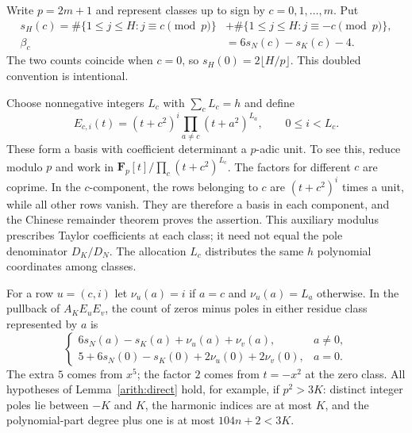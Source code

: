 Write $p=2m+1$ and represent classes up to sign by
$c=0,1,\ldots,m$. Put
\begin{align*}
 s_H(c)=\#\{1\le j\le H:j\equiv c\pmod p\}
       &+\#\{1\le j\le H:j\equiv-c\pmod p\},\\
 \beta_c&=6s_N(c)-s_K(c)-4.
\end{align*}
The two counts coincide when $c=0$, so $s_H(0)=2\lfloor H/p\rfloor$.
This doubled convention is intentional.

Choose nonnegative integers $L_c$ with $\sum_cL_c=h$ and define
\[
 E_{c,i}(t)=(t+c^2)^i\prod_{a\ne c}(t+a^2)^{L_a},
 \qquad 0\le i<L_c.
\]
These form a basis with coefficient determinant a $p$-adic unit.
To see this, reduce modulo $p$ and work in
$\mathbf F_p[t]/\prod_c(t+c^2)^{L_c}$.
The factors for different $c$ are coprime. In the $c$-component,
the rows belonging to $c$ are $(t+c^2)^i$ times a unit, while
all other rows vanish. They are therefore a basis in each component,
and the Chinese remainder theorem proves the assertion.
This auxiliary modulus prescribes Taylor coefficients at each class;
it need not equal the pole denominator \(D_K/D_N\). The allocation
\(L_c\) distributes the same \(h\) polynomial coordinates among classes.

For a row $u=(c,i)$ let
$\nu_u(a)=i$ if $a=c$ and $\nu_u(a)=L_a$ otherwise.
In the pullback of $A_KE_uE_v$, the count of zeros minus poles in
either residue class represented by $a$ is
\[
 \begin{cases}
 6s_N(a)-s_K(a)+\nu_u(a)+\nu_v(a),&a\ne0,\\
 5+6s_N(0)-s_K(0)+2\nu_u(0)+2\nu_v(0),&a=0.
 \end{cases}
\]
The extra $5$ comes from $x^5$; the factor $2$ comes from
$t=-x^2$ at the zero class.
All hypotheses of Lemma~\ref{arith:direct} hold, for example, if
$p^2>3K$: distinct integer poles lie between $-K$ and $K$,
the harmonic indices are at most $K$, and the polynomial-part
degree plus one is at most $104n+2<3K$.

